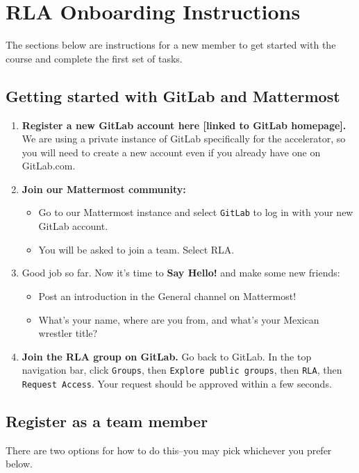\documentclass[12pt,twoside]{mitthesis}
\begin{document}
\chapter{RLA Onboarding Instructions}

The sections below are instructions for a new member to get started with the course and complete the first set of tasks.

\section*{Getting started with GitLab and Mattermost}

\begin{enumerate}
\item \textbf{Register a new GitLab account here [linked to GitLab homepage].} We are using a private instance of GitLab specifically for the accelerator, so you will need to create a new account even if you already have one on GitLab.com.
\item \textbf{Join our Mattermost community:}
\begin{itemize}
	\item Go to our Mattermost instance and select \texttt{GitLab} to log in with your new GitLab account. 
	\item You will be asked to join a team. Select RLA. 
\end{itemize}
\item Good job so far. Now it's time to \textbf{Say Hello!} and make some new friends:
\begin{itemize}
	\item Post an introduction in the General channel on Mattermost!
	\item What's your name, where are you from, and what's your Mexican wrestler title?
\end{itemize}
\item \textbf{Join the RLA group on GitLab.} Go back to GitLab. In the top navigation bar, click \texttt{Groups}, then \texttt{Explore public groups}, then \texttt{RLA}, then \texttt{Request Access}. Your request should be approved within a few seconds.
\end{enumerate}

\section*{Register as a team member}

There are two options for how to do this--you may pick whichever you prefer below.
\end{document}

